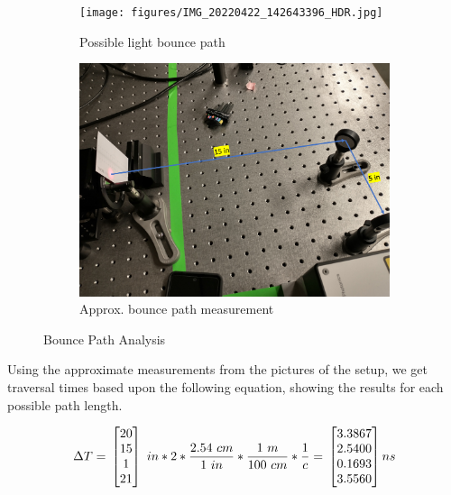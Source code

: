 \documentclass[a4paper]{article}
\begin{document}
\begin{figure}
     \centering
     \begin{subfigure}[b]{0.49\textwidth}
         \centering
         \texttt{[image: figures/IMG\_20220422\_142643396\_HDR.jpg]}
         \caption{Possible light bounce path}
         \label{fig:light_path}
     \end{subfigure}
     \hfill
     \begin{subfigure}[b]{0.49\textwidth}
         \centering
         \includegraphics[width=\textwidth]{figures/distance_drawing.png}
         \caption{Approx. bounce path measurement}
         \label{fig:light_path_measured}
     \end{subfigure}
        \caption{Bounce Path Analysis}
        \label{fig:light_path_all}
\end{figure}

Using the approximate measurements from the pictures of the setup, we get traversal times based upon the following equation, showing the results for each possible path length.

\[
\Delta T=\\
\begin{bmatrix}
20\\
15\\
1\\
21\\
\end{bmatrix}
\ in * 2 * \frac{2.54\ cm}{1\ in} * \frac{1\ m}{100\ cm} * \frac{1}{c} = \\
\begin{bmatrix}
3.3867\\
2.5400\\
0.1693\\
3.5560\\
\end{bmatrix}
ns
\]
\end{document}
